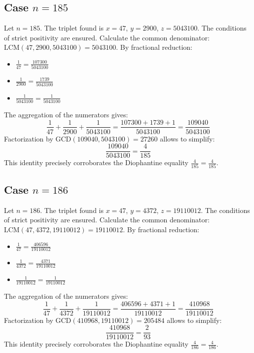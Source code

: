 \documentclass[11pt,a4paper]{article}
\begin{document}
\subsection{Case $n = 185$}
Let $n = 185$. The triplet found is $x = 47$, $y = 2900$, $z = 5043100$.
The conditions of strict positivity are ensured.
Calculate the common denominator: $\text{LCM}(47, 2900, 5043100) = 5043100$.
By fractional reduction:
\begin{itemize}
    \item $\frac{1}{47} = \frac{107300}{5043100}$
    \item $\frac{1}{2900} = \frac{1739}{5043100}$
    \item $\frac{1}{5043100} = \frac{1}{5043100}$
\end{itemize}
The aggregation of the numerators gives:
$$ \frac{1}{47} + \frac{1}{2900} + \frac{1}{5043100} = \frac{107300 + 1739 + 1}{5043100} = \frac{109040}{5043100} $$
Factorization by $\text{GCD}(109040, 5043100) = 27260$ allows to simplify:
$$ \frac{109040}{5043100} = \frac{4}{185} $$
This identity precisely corroborates the Diophantine equality $\frac{4}{185} = \frac{4}{185}$.

\subsection{Case $n = 186$}
Let $n = 186$. The triplet found is $x = 47$, $y = 4372$, $z = 19110012$.
The conditions of strict positivity are ensured.
Calculate the common denominator: $\text{LCM}(47, 4372, 19110012) = 19110012$.
By fractional reduction:
\begin{itemize}
    \item $\frac{1}{47} = \frac{406596}{19110012}$
    \item $\frac{1}{4372} = \frac{4371}{19110012}$
    \item $\frac{1}{19110012} = \frac{1}{19110012}$
\end{itemize}
The aggregation of the numerators gives:
$$ \frac{1}{47} + \frac{1}{4372} + \frac{1}{19110012} = \frac{406596 + 4371 + 1}{19110012} = \frac{410968}{19110012} $$
Factorization by $\text{GCD}(410968, 19110012) = 205484$ allows to simplify:
$$ \frac{410968}{19110012} = \frac{2}{93} $$
This identity precisely corroborates the Diophantine equality $\frac{4}{186} = \frac{4}{186}$.
\end{document}
